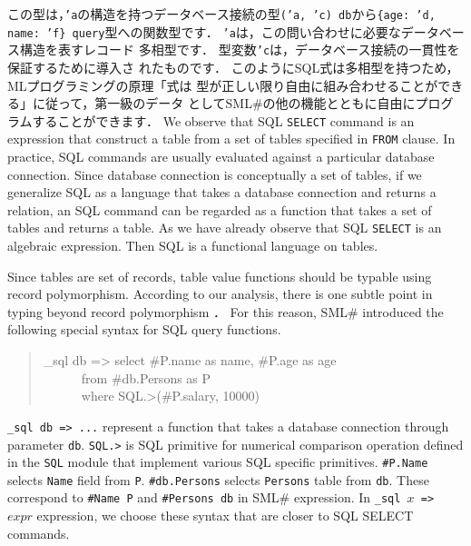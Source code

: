 \documentclass{jbook}
\newcommand{\smlsharp}{SML\#}
\newcommand{\myem}{\mbox{\ \ }}
\newenvironment{program}{\begin{quote}\begin{tt}}%
                        {\end{tt}\end{quote}}
\begin{document}
	この型は，{\tt 'a}の構造を持つデータベース接続の型{\tt  ('a, 'c)
db}から{\tt \{age: 'd, name: 'f\} query}型への関数型です．
	{\tt 'a}は，この問い合わせに必要なデータベース構造を表すレコード
多相型です．
	型変数{\tt 'c}は，データベース接続の一貫性を保証するために導入さ
れたものです．
	このようにSQL式は多相型を持つため，MLプログラミングの原理「式は
型が正しい限り自由に組み合わせることができる」に従って，第一級のデータ
として\smlsharp{}の他の機能とともに自由にプログラムすることができます．
\else%
	We observe that SQL {\tt SELECT} command is an expression that
construct a table from a set of tables specified in {\tt FROM} clause.
	In practice, SQL commands are usually evaluated against a
particular database connection.
	Since database connection is conceptually a set of tables, 
if we generalize SQL as a language that takes a database connection and
returns a relation, an SQL command can be regarded as a function that
takes a set of tables and returns a table.
	As we have already observe that SQL {\tt SELECT} is an algebraic
expression.
	Then SQL is a functional language on tables.

	Since tables are set of records, table value functions should be
typable using record polymorphism.
	According to our analysis, there is one subtle point in typing
beyond record polymorphism \cite{ohori11}．
	For this reason, \smlsharp{} introduced the following special
syntax for SQL query functions.
\begin{program}
\_sql db => select \#P.name as name, \#P.age as age\\
\myem\myem\myem from \#db.Persons as P\\
\myem\myem\myem where SQL.>(\#P.salary, 10000)
\end{program}
	{\tt \_sql db => ...} represent a function that takes a database
connection through parameter {\tt db}.
	{\tt SQL.>} is SQL primitive for numerical comparison operation
defined in the {\tt SQL} module that implement various SQL specific
primitives.
	{\tt \#P.Name} selects {\tt Name} field from {\tt P}.
{\tt \#db.Persons} selects {\tt Persons} table from {\tt db}.
	These correspond to {\tt \#Name P} and {\tt \#Persons db} in
\smlsharp{} expression.
	In {\tt \_sql $x$ => $expr$} expression, we choose these syntax
that are closer to SQL SELECT commands.
	
\end{document}
